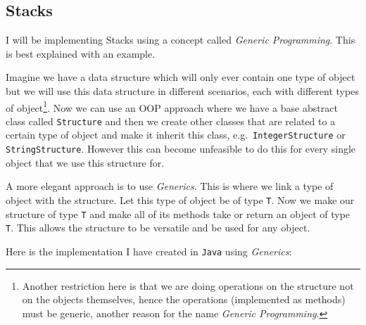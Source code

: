 \documentclass[../../../../../main.tex]{subfiles}
\begin{document}
\subsection{Stacks}
I will be implementing Stacks using a concept called \textit{Generic Programming\cite{generics}}. This is best explained with an example.

Imagine we have a data structure which will only ever contain one type of object but we will use this data structure in different scenarios, each with different types of object\footnote{Another restriction here is that we are doing operations on the structure not on the objects themselves, hence the operations (implemented as methods) must be generic, another reason for the name \textit{Generic Programming\cite{generics}}.}.
 Now we can use an OOP approach where we have a base abstract class called \texttt{Structure} and then we create other classes that are related to a certain type of object and make it inherit this class, e.g.\ \texttt{IntegerStructure} or \texttt{StringStructure}. However this can become unfeasible to do this for every single object that we use this structure for.
 
 A more elegant approach is to use \textit{Generics}. This is where we link a type of object with the structure. Let this type of object be of type \texttt{T}. Now we make our structure of type \texttt{T} and make all of its methods take or return an object of type \texttt{T}. This allows the structure to be versatile and be used for any object.

Here is the implementation I have created in \texttt{Java} using \textit{Generics\cite{genericsJava}}:
\end{document}
